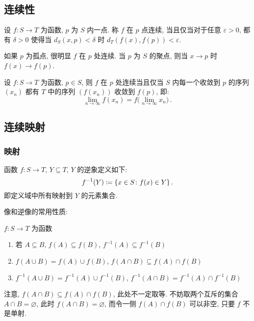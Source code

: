 \documentclass[UTF8]{ctexart}
\theoremstyle{mystyle}
\DeclarePairedDelimiter\set{\lbrace}{\rbrace}
\renewcommand{\epsilon}{\varepsilon}
\begin{document}
\subsection{连续性}
\begin{definition}
    设 $ f \colon S \to T $ 为函数, $ p $ 为 $ S $ 内一点. 称 $ f $ 在 $ p $ 点连续, 当且仅当对于任意 $ \epsilon > 0 $, 都有 $ \delta > 0 $ 使得当 $ d_S(x, p) < \delta $ 时 $ d_T(f(x), f(p)) < \epsilon $.
\end{definition}

如果 $ p $ 为孤点, 很明显 $ f $ 在 $ p $ 处连续. 当 $ p $ 为 $ S $ 的聚点, 则当 $ x \to p $ 时 $ f(x) \to f(p) $.

\begin{proposition}
    设 $ f \colon S \to T $ 为函数, $ p \in S $, 则 $ f $ 在 $ p $ 处连续当且仅当 $ S $ 内每一个收敛到 $ p $ 的序列 $ (x_n) $ 都有 $ T $ 中的序列 $ (f(x_n)) $ 收敛到 $ f(p) $, 即:
    \[ 
        \lim_{n \to \infty} f(x_n) = f \big( \lim_{n \to \infty} x_n \big) \,.
    \]
\end{proposition}

\subsection{连续映射}
\subsubsection{映射}
\begin{definition}[\text{逆象}]
    函数 $ f \colon S \to T $, $ Y \subseteq T $, $ Y $ 的逆象定义如下: \[ f^{-1}(Y) \coloneqq \set{x \in S \colon f(x) \in Y} \,.\] 即定义域中所有映射到 $ Y $ 的元素集合.
\end{definition}

像和逆像的常用性质:
\begin{proposition}
    $ f \colon S \to T $ 为函数
    \begin{enumerate}
        \item 若 $ A \subseteq B $, $ f(A) \subseteq f(B) $, $ f^{-1}(A) \subseteq f^{-1}(B) $
        \item $ f(A \cup B) = f(A) \cup f(B) $, $ f(A \cap B) \subseteq f(A) \cap f(B) $
        \item $ f^{-1}(A \cup B) = f^{-1}(A) \cup f^{-1}(B) $, $ f^{-1}(A \cap B) = f^{-1}(A) \cap f^{-1}(B) $
    \end{enumerate}
\end{proposition}

注意, $ f(A \cap B) \subseteq f(A) \cap f(B) $, 此处不一定取等. 不妨取两个互斥的集合 $ A \cap B = \varnothing $, 此时 $ f(A \cap B) = \varnothing $, 而令一侧 $ f(A) \cap f(B) $ 可以非空, 只要 $ f $ 不是单射.
\end{document}
